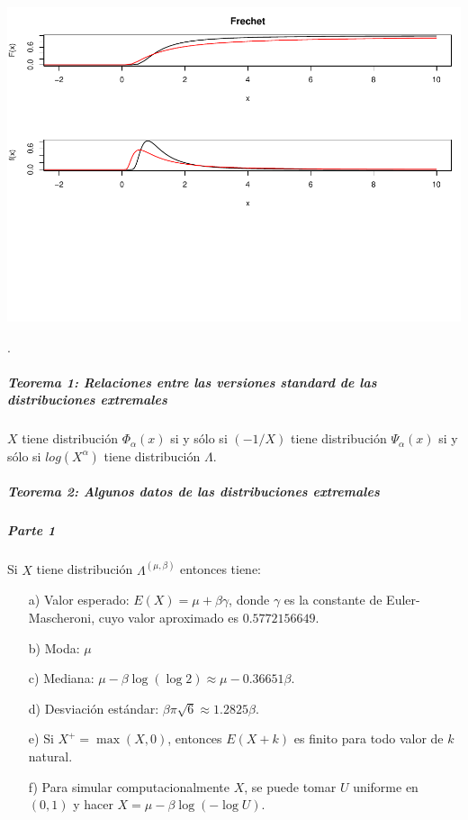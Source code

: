 \documentclass[
  12pt]{article}
\begin{document}
\includegraphics{extremales_files/figure-latex/unnamed-chunk-19-1.pdf}

.

\newpage

\hypertarget{teorema-1-relaciones-entre-las-versiones-standard-de-las-distribuciones-extremales}{%
\subparagraph{Teorema 1: Relaciones entre las versiones standard de las
distribuciones
extremales}\label{teorema-1-relaciones-entre-las-versiones-standard-de-las-distribuciones-extremales}}

\(X\) tiene distribución \(\Phi_{\alpha}(x)\) si y sólo si \((-1/X)\)
tiene distribución \(\Psi_{\alpha}(x)\) si y sólo si \(log(X^{\alpha})\)
tiene distribución \(\Lambda\).

\hypertarget{teorema-2-algunos-datos-de-las-distribuciones-extremales}{%
\subparagraph{Teorema 2: Algunos datos de las distribuciones
extremales}\label{teorema-2-algunos-datos-de-las-distribuciones-extremales}}

\hypertarget{parte-1}{%
\subparagraph{Parte 1}\label{parte-1}}

Si \(X\) tiene distribución \(\Lambda^{(\mu,\beta)}\) entonces tiene:

\begin{itemize}
  \item[a)] Valor esperado: $E(X) = \mu + \beta\gamma$, donde $\gamma$ es la constante de Euler-Mascheroni, cuyo valor aproximado es $0.5772156649$.
  \item[b)] Moda: $\mu$
  \item[c)] Mediana: $\mu - \beta \log(\log 2) \approx \mu - 0.36651 \beta$.
  \item[d)] Desviación estándar: $\beta \pi \sqrt{6} \approx 1.2825 \beta$.
  \item[e)] Si $X^+ = \max(X,0)$, entonces $E(X+k)$ es finito para todo valor de $k$ natural.
  \item[f)] Para simular computacionalmente $X$, se puede tomar $U$ uniforme en $(0,1)$ y hacer $X = \mu - \beta \log(-\log U)$.
\end{itemize}
\end{document}
